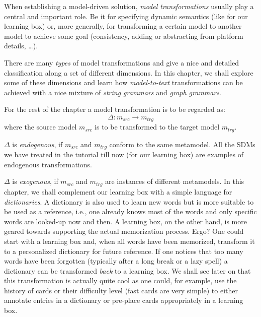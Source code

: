 \genHeader

When establishing a model-driven solution, \emph{model transformations} usually play a central and important role. Be it for
specifying dynamic semantics (like for our learning box) or, more generally, for transforming a certain model to another model to achieve some goal (consistency, adding or abstracting from
platform details, \ldots).

There are many \emph{types} of model transformations and \cite{CH03,Mens_Gorp_2006} give a nice and detailed classification along a set of different
dimensions. In this chapter, we shall explore some of these dimensions and learn how \emph{model-to-text}
transformations can be achieved with a nice mixture of \emph{string grammars} and \emph{graph grammars}.

For the rest of the chapter a model transformation is to be regarded as:
\begin{displaymath}
 	\Delta: m_{src} \rightarrow m_{trg}
\end{displaymath}
where the source model $m_{src}$ is to be transformed to the target model $m_{trg}$.

$\Delta$ is \emph{endogenous}, if $m_{src}$ and $m_{trg}$ conform to the same metamodel. All the SDMs we have
treated in the tutorial till now (for our learning box) are examples of endogenous transformations.

$\Delta$ is \emph{exogenous}, if $m_{src}$ and $m_{trg}$ are instances of different metamodels. In this chapter, we
shall complement our learning box with a simple language for \emph{dictionaries}. A dictionary is also used to learn new words but is more suitable to be used
as a reference, i.e., one already knows most of the words and only specific words are looked-up now and then. A learning box, on the other hand, is more geared
towards supporting the actual memorization process. Ergo?  One could start with a learning box and, when all words have been memorized, transform it to a
personalized dictionary for future reference. If one notices that too many words have been forgotten (typically after a long break or a lazy spell) a dictionary
can be transformed \emph{back} to a learning box. We shall see later on that this transformation is actually quite cool as one could, for example, use the
history of cards or their difficulty level (fast cards are very simple) to either annotate entries in a dictionary or pre-place cards appropriately in a
learning box.

